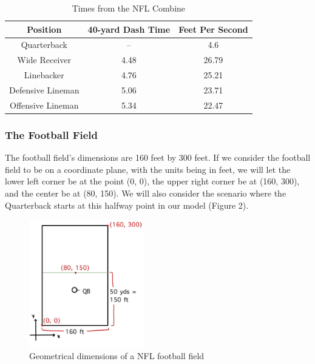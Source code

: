 \newpage

\begin{table}[h]
    \centering
    \begin{tabular}{ |c|c|c| } 
     \hline
     \textbf{Position}\footnotemark & \textbf{40-yard Dash Time} & \textbf{Feet Per Second} \\ 
     \hline
     Quarterback & -- & 4.6 \\ 
     Wide Receiver & 4.48 & 26.79 \\ 
     Linebacker & 4.76 & 25.21 \\ 
     Defensive Lineman & 5.06 & 23.71 \\ 
     Offensive Lineman & 5.34 & 22.47 \\ 
     \hline
    \end{tabular}
    \caption{Times from the NFL Combine}
\end{table}



\subsubsection{The Football Field}

\quad The football field’s dimensions are 160 feet by 300 feet. If we consider the football field to be on a coordinate plane, with the units being in feet, we will let the lower left corner be at the point (0, 0), the upper right corner be at (160, 300), and the center be at (80, 150). We will also consider the scenario where the Quarterback starts at this halfway point in our model (Figure 2).

\begin{figure}[htp]
    \centering
    \includegraphics[width=5cm]{figure/1_dimensions.jpg}
    \caption{Geometrical dimensions of a NFL football field}
\end{figure}

